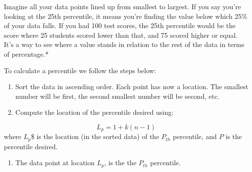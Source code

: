 \documentclass[
  11pt,
  letterpaper,
  DIV=11,
  numbers=noendperiod,
  oneside,
  open=any]{scrreprt}
\providecommand{\tightlist}{%
  \setlength{\itemsep}{0pt}\setlength{\parskip}{0pt}}\usepackage{longtable,booktabs,array}
\begin{document}
\begin{bsexample}[Example]

Imagine all your data points lined up from smallest to largest. If you
say you're looking at the 25th percentile, it means you're finding the
value below which 25\% of your data falls. If you had 100 test scores,
the 25th percentile would be the score where 25 students scored lower
than that, and 75 scored higher or equal. It's a way to see where a
value stands in relation to the rest of the data in terms of
percentage.*

\end{bsexample}

To calculate a percentile we follow the steps below:

\begin{enumerate}
\def\labelenumi{\arabic{enumi}.}
\item
  Sort the data in ascending order. Each point has now a location. The
  smallest number will be first, the second smallest number will be
  second, etc.
\item
  Compute the location of the percentile desired using:
\end{enumerate}

\begin{bsformula}

\[L_{p}=1+k(n-1)\] where \(L_{p}\)\$ is the location (in the sorted
data) of the \(P_{th}\) percentile, and \(P\) is the percentile desired.

\end{bsformula}

\begin{enumerate}
\def\labelenumi{\arabic{enumi}.}
\setcounter{enumi}{2}
\tightlist
\item
  The data point at location \(L_p\), is the the \(P_{th}\) percentile.
\end{enumerate}
\end{document}
